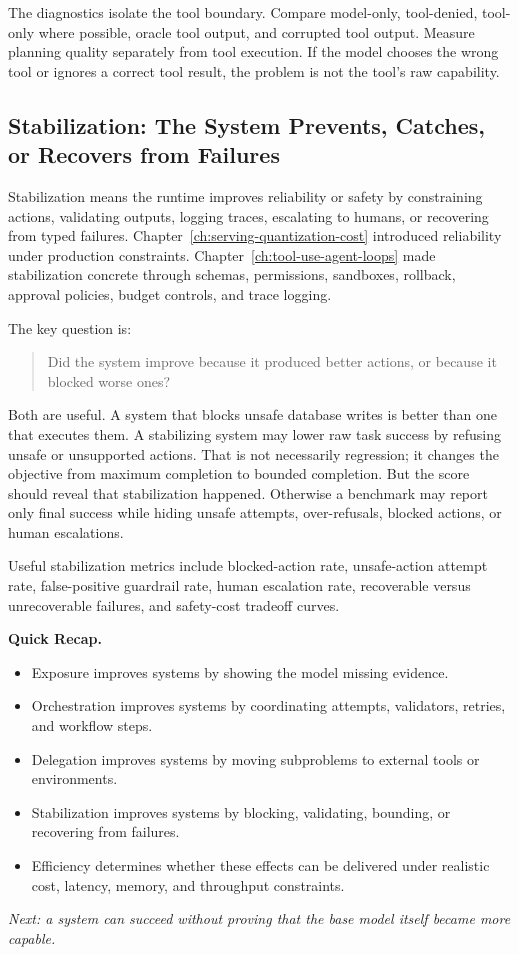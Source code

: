The diagnostics isolate the tool boundary. Compare model-only, tool-denied, tool-only where possible, oracle tool output, and corrupted tool output. Measure planning quality separately from tool execution. If the model chooses the wrong tool or ignores a correct tool result, the problem is not the tool's raw capability.

\subsection{Stabilization: The System Prevents, Catches, or Recovers from Failures}

Stabilization means the runtime improves reliability or safety by constraining actions, validating outputs, logging traces, escalating to humans, or recovering from typed failures. Chapter~\ref{ch:serving-quantization-cost} introduced reliability under production constraints. Chapter~\ref{ch:tool-use-agent-loops} made stabilization concrete through schemas, permissions, sandboxes, rollback, approval policies, budget controls, and trace logging.

The key question is:

\begin{quote}
Did the system improve because it produced better actions, or because it blocked worse ones?
\end{quote}

Both are useful. A system that blocks unsafe database writes is better than one that executes them. A stabilizing system may lower raw task success by refusing unsafe or unsupported actions. That is not necessarily regression; it changes the objective from maximum completion to bounded completion. But the score should reveal that stabilization happened. Otherwise a benchmark may report only final success while hiding unsafe attempts, over-refusals, blocked actions, or human escalations.

Useful stabilization metrics include blocked-action rate, unsafe-action attempt rate, false-positive guardrail rate, human escalation rate, recoverable versus unrecoverable failures, and safety-cost tradeoff curves.

\begin{quickrecap}
\textbf{Quick Recap.}
\begin{itemize}[nosep,leftmargin=1.5em]
  \item Exposure improves systems by showing the model missing evidence.
  \item Orchestration improves systems by coordinating attempts, validators, retries, and workflow steps.
  \item Delegation improves systems by moving subproblems to external tools or environments.
  \item Stabilization improves systems by blocking, validating, bounding, or recovering from failures.
  \item Efficiency determines whether these effects can be delivered under realistic cost, latency, memory, and throughput constraints.
\end{itemize}
\textit{Next: a system can succeed without proving that the base model itself became more capable.}
\end{quickrecap}


